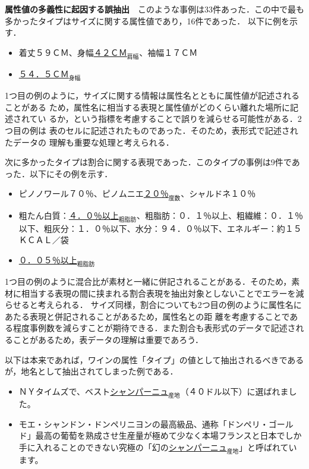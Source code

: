 \documentclass[japanese]{jnlp_1.4}
\begin{document}
\vspace{1\Cvs}
\noindent
\textbf{属性値の多義性に起因する誤抽出}　このような事例は33件あった．この中で最も多かったタイプはサイズに関する属性値であり，16件であった．
以下に例を示す．

\begin{itemize}
\item 着丈５９ＣＭ、身幅\underline{４２ＣＭ}$_{肩幅}$、袖幅１７ＣＭ
\item \underline{５４．５ＣＭ}$_{身幅}$
\end{itemize}

\noindent 1つ目の例のように，サイズに関する情報は属性名とともに属性値が記述されることがある
ため，属性名に相当する表現と属性値がどのくらい離れた場所に記述されてい
るか，という指標を考慮することで誤りを減らせる可能性がある．2つ目の例は
表のセルに記述されたものであった．そのため，表形式で記述されたデータの
理解も重要な処理と考えられる．


次に多かったタイプは割合に関する表現であった．このタイプの事例は9件であった．以下にその例を示す．

\begin{itemize}
\item ピノノワール７０％、ピノムニエ\underline{２０％}$_{度数}$、シャルドネ１０％
\item 粗たん白質：\underline{４．０％以上}$_{粗脂肪}$、粗脂肪：０．１％以上、粗繊維：０．１％以下、粗灰分：１．０％以下、水分：９４．０％以下、エネルギー：約１５ＫＣＡＬ／袋
\item \underline{０．０５％以上}$_{粗脂肪}$
\end{itemize}

\noindent
1つ目の例のように混合比が素材と一緒に併記されることがある．そのため，素材に相当する表現の間に挟まれる割合表現を抽出対象としないことでエラーを減らせると考えられる．
サイズ同様，割合についても2つ目の例のように属性名にあたる表現と併記されることがあるため，属性名との距
離を考慮することである程度事例数を減らすことが期待できる．また割合も表形式のデータで記述されることがあるため，表データの理解は重要であろう．

以下は本来であれば，ワインの属性「タイプ」の値として抽出されるべきであるが，地名として抽出されてしまった例である．

\begin{itemize}
\item ＮＹタイムズで、ベスト\underline{シャンパーニュ}$_{産地}$（４０ドル以下）に選ばれました。
\item モエ・シャンドン・ドンペリニヨンの最高級品、通称「ドンペリ・ゴールド」最高の葡萄を熟成させ生産量が極めて少なく本場フランスと日本でしか手に入れることのできない究極の「幻の\underline{シャンパーニュ}$_{産地}$」と呼ばれています。
\end{itemize}
\end{document}
